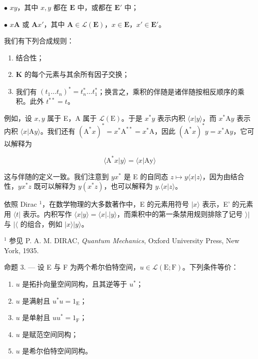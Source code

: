 \(\bullet\) \(xy\)，其中 \(x, y\) 都在 \(\mathbf{E}\) 中，或都在 \(\mathbf{E}'\) 中；

\(\bullet\) \(x\mathbf{A}\) 或 \(\mathbf{A}x'\)，其中 \(\mathbf{A} \in \mathcal{L}(\mathbf{E})\)，\(x \in \mathbf{E}\)，\(x' \in \mathbf{E}'\)。

我们有下列合成规则：

\begin{enumerate}
\def\labelenumi{\alph{enumi})}
\item
  结合性；
\item
  \(\mathbf{K}\) 的每个元素与其余所有因子交换；
\item
  我们有 \((t_1 \ldots t_n)^* = t_n^* \ldots t_1^*\)；换言之，乘积的伴随是诸伴随按相反顺序的乘积。此外 \(t^{**} = t\)。
\end{enumerate}

例如，设 \(x, y\) 属于 E，A 属于 \(\mathcal{L}(\mathrm{E})\)。于是 \(x^{*}y\) 表示内积 \(\langle x|y\rangle\)，而 \(x^{*}\mathrm{A}y\) 表示内积 \(\langle x|\mathrm{A}y\rangle\)。我们还有 \((\mathrm{A}^{*}x)^{*} = x^{*}\mathrm{A}^{**} = x^{*}\mathrm{A}\)，因此 \((\mathrm{A}^{*}x)^{*}y = x^{*}\mathrm{A}y\)，它可以解释为

\[
\langle \mathrm{A} ^ {*} x | y \rangle = \langle x | \mathrm{Ay} \rangle
\]

这与伴随的定义一致。我们注意到 \(yx^{*}\) 是 E 的自同态 \(z \mapsto y\langle x|z\rangle\)，因为由结合性，\(yx^{*}z\) 既可以解释为 \(y(x^{*}z)\)，也可以解释为 \(y.\langle x|z\rangle\)。

依照 Dirac \(^{1}\)，在数学物理的大多数著作中，E 的元素用符号 \(|x\rangle\) 表示，E' 的元素用 \(\langle t|\) 表示。内积写作 \(\langle x|y\rangle = \langle x|.|y\rangle\)，而乘积中的第一条禁用规则排除了记号 \(\rangle|\) 与 \(|\langle\) 的组合，例如 \(|x\rangle|y\rangle\)。

\(^{1}\) 参见 P. A. M. DIRAC, \emph{Quantum Mechanics}, Oxford University Press, New York, 1935.

命题 3. --- 设 E 与 F 为两个希尔伯特空间，\(u \in \mathcal{L}(\mathrm{E};\mathrm{F})\)。下列条件等价：

\begin{enumerate}
\def\labelenumi{(\roman{enumi})}
\item
  \(u\) 是拓扑向量空间同构，且其逆等于 \(u^{*}\)；
\item
  \(u\) 是满射且 \(u^{*}u = 1_{\mathrm{E}}\)；
\item
  \(u\) 是单射且 \(uu^{*} = 1_{\mathrm{F}}\)；
\item
  \(u\) 是赋范空间同构；
\item
  \(u\) 是希尔伯特空间同构。
\end{enumerate}

